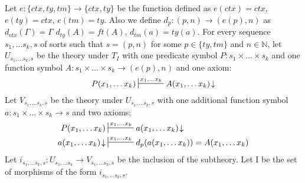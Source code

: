 \documentclass[reqno]{amsart}
\theoremstyle{definition}
\theoremstyle{remark}
\newcommand{\I}{\mathrm{I}}
\numberwithin{figure}{section}
\begin{document}
Let $e : \{ ctx, ty, tm \} \to \{ ctx, ty \}$ be the function defined as $e(ctx) = ctx$, $e(ty) = ctx$, $e(tm) = ty$.
Also we define $d_p : (p,n) \to (e(p),n)$ as $d_{ctx}(\Gamma) = \Gamma$ $d_{ty}(A) = ft(A)$, $d_{tm}(a) = ty(a)$.
For every sequence $s_1, \ldots s_k, s$ of sorts such that $s = (p,n)$ for some $p \in \{ ty, tm \}$ and $n \in \mathbb{N}$,
let $U_{s_1, \ldots s_k, s}$ be the theory under $T_I$ with one predicate symbol $P : s_1 \times \ldots \times s_k$
and one function symbol $A : s_1 \times \ldots \times s_k \to (e(p),n)$ and one axiom:
\[ P(x_1, \ldots x_k) \sststile{}{x_1, \ldots x_k} A(x_1, \ldots x_k)\!\downarrow \]
Let $V_{s_1, \ldots s_k, s}$ be the theory under $U_{s_1, \ldots s_k, s}$ with one additional function symbol $a : s_1 \times \ldots \times s_k \to s$ and two axioms:
\begin{align*}
P(x_1, \ldots x_k) & \sststile{}{x_1, \ldots x_k} a(x_1, \ldots x_k)\!\downarrow \\
a(x_1, \ldots x_k)\!\downarrow & \sststile{}{x_1, \ldots x_k} d_p(a(x_1, \ldots x_k)) = A(x_1, \ldots x_k)
\end{align*}
Let $i_{s_1, \ldots s_k, s} : U_{s_1, \ldots s_k} \to V_{s_1, \ldots s_k, s}$ be the inclusion of the subtheory.
Let $\I$ be the set of morphisms of the form $i_{s_1, \ldots s_k, s}$.
\end{document}
